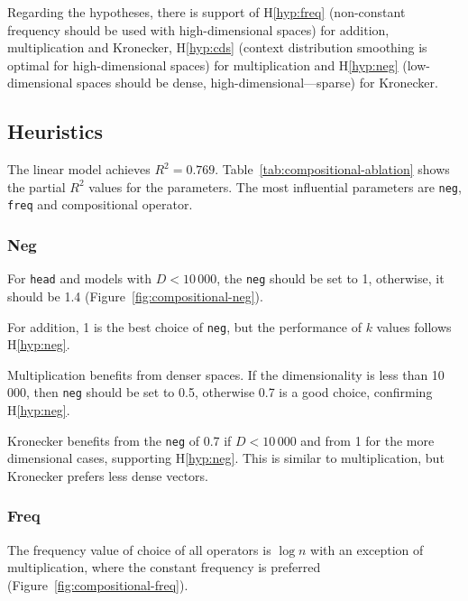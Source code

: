 Regarding the hypotheses, there is support of H\ref{hyp:freq} (non-constant frequency should be used with high-dimensional spaces) for addition, multiplication and Kronecker, H\ref{hyp:cds} (context distribution smoothing is optimal for high-dimensional spaces) for multiplication and H\ref{hyp:neg} (low-dimensional spaces should be dense, high-dimensional---sparse) for Kronecker.

\subsection{Heuristics}
\label{sec:heuristics-compositional}



The linear model achieves  $R^2 = 0.769$. Table~\ref{tab:compositional-ablation} shows the partial $R^2$ values for the parameters. The most influential parameters are \texttt{neg}, \texttt{freq} and compositional operator.

\subsubsection{Neg}
\label{sec:neg-compositional}



For \texttt{head} and models with $D < 10\,000$, the \texttt{neg} should be set to 1, otherwise, it should be 1.4 (Figure~\ref{fig:compositional-neg}).

For addition, 1 is the best choice of \texttt{neg}, but the performance of $k$ values follows H\ref{hyp:neg}.

Multiplication benefits from denser spaces. If the dimensionality is less than 10\,000, then \texttt{neg} should be set to 0.5, otherwise 0.7 is a good choice, confirming H\ref{hyp:neg}.

Kronecker benefits from the \texttt{neg} of 0.7 if $D < 10\,000$ and from 1 for the more dimensional cases, supporting H\ref{hyp:neg}. This is similar to multiplication, but Kronecker prefers less dense vectors.

\subsubsection{Freq}
\label{sec:freq-compositional}

The frequency value of choice of all operators is $\log n$ with an exception of multiplication, where the constant frequency is preferred (Figure~\ref{fig:compositional-freq}).
%
%

